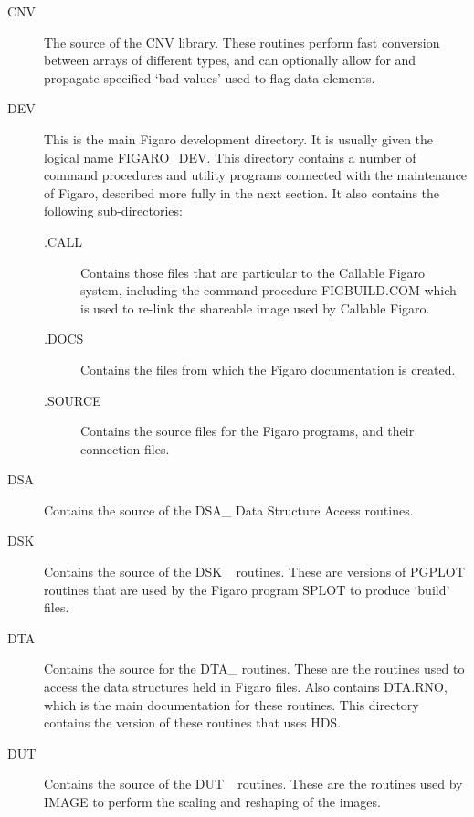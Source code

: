 \begin{description}

\item [CNV] The source of the CNV library. These routines perform fast
conversion between arrays of different types, and can optionally allow for and
propagate specified `bad values' used to flag data elements.

\item [DEV] This is the main Figaro development directory. It is usually given
the logical name FIGARO\_DEV. This directory contains a number of command
procedures and utility programs connected with the maintenance of Figaro,
described more fully in the next section. It also contains the following
sub-directories:

\begin{description}

\item [.CALL] Contains those files that are particular to the Callable Figaro 
system, including the command procedure FIGBUILD.COM which is used to re-link 
the shareable image used by Callable Figaro.

\item [.DOCS] Contains the files from which the Figaro documentation is
created.

\item [.SOURCE] Contains the source files for the Figaro programs, and their
connection files.

\end{description}

\item [DSA] Contains the source of the DSA\_ Data Structure Access routines.

\item [DSK] Contains the source of the DSK\_ routines. These are versions of
PGPLOT routines that are used by the Figaro program SPLOT to produce `build'
files.

\item [DTA] Contains the source for the DTA\_ routines. These are the 
routines used to access the data structures held in Figaro files. Also 
contains DTA.RNO, which is the main documentation for these routines. This
directory contains the version of these routines that uses HDS.

\item [DUT] Contains the source of the DUT\_ routines. These are the 
routines used by IMAGE to perform the scaling and reshaping of the images.


\end{description}
